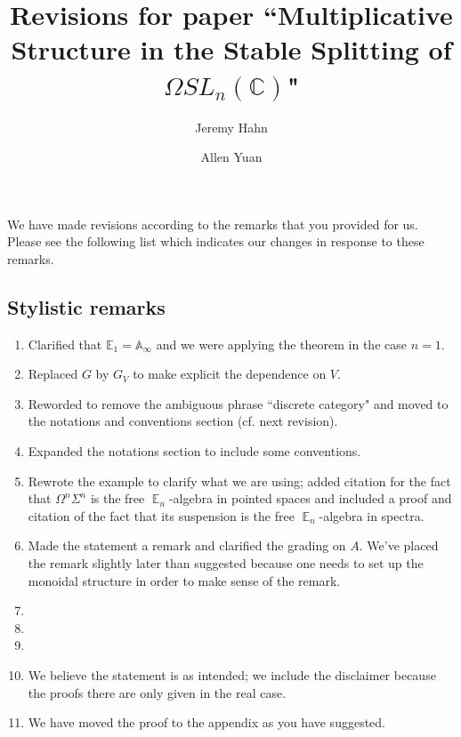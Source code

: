\documentclass[reqno, oneside]{amsart}
\theoremstyle{definition}
\theoremstyle{plain}
\DeclareMathOperator{\E}{\mathbb{E}}
\begin{document}
\title{Revisions for paper ``Multiplicative Structure in the Stable Splitting of $\Omega SL_n(\mathbb{C})$"}
\author{Jeremy Hahn}
\address{Department of Mathematics, Harvard University, Cambridge, MA 02138}

\author{Allen Yuan}
\address{Department of Mathematics, Massachusetts Institute of Technology, Cambridge, MA 02139}



\maketitle

We have made revisions according to the remarks that you provided for us.  Please see the following list which indicates our changes in response to these remarks.  

\subsection{Stylistic remarks}
\begin{enumerate}
\item Clarified that $\mathbb{E}_1 = \mathbb{A}_{\infty}$ and we were applying the theorem in the case $n=1$.  
\item Replaced $G$ by $G_V$ to make explicit the dependence on $V$.  
\item Reworded to remove the ambiguous phrase ``discrete category" and moved to the notations and conventions section (cf. next revision).
\item Expanded the notations section to include some conventions.  
\item Rewrote the example to clarify what we are using; added citation for the fact that $\Omega^n \Sigma^n$ is the free $\E_n$-algebra in pointed spaces and included a proof and citation of the fact that its suspension is the free $\E_n$-algebra in spectra.   
\item Made the statement a remark and clarified the grading on $A$.  We've placed the remark slightly later than suggested because one needs to set up the monoidal structure in order to make sense of the remark.  
\item %
\item %
\item %
\item We believe the statement is as intended; we include the disclaimer because the proofs there are only given in the real case.  
\item We have moved the proof to the appendix as you have suggested.  
\end{enumerate}
\end{document}
